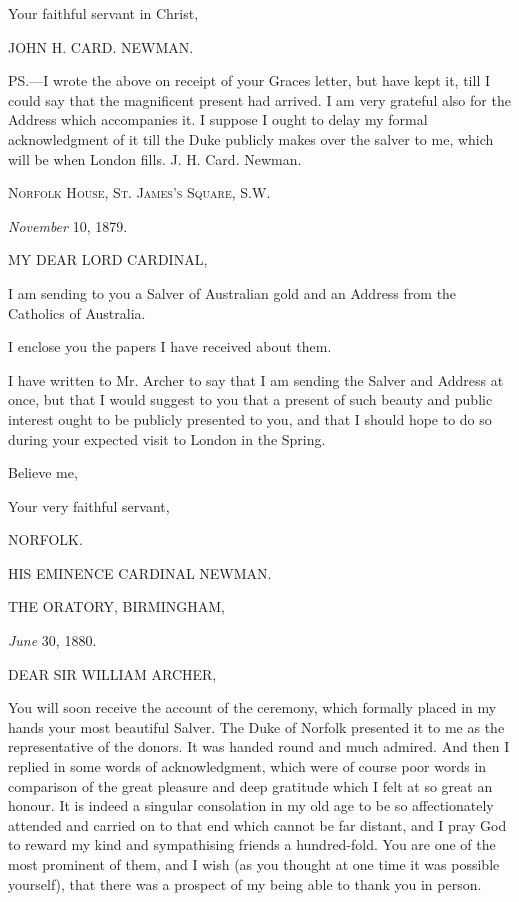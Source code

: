 Your faithful servant in Christ,

JOHN H. CARD. NEWMAN.

PS.—I wrote the above on receipt of your Graces letter, but have
kept it, till I could say that the magnificent present had arrived. I
am very grateful also for the Address which accompanies it. I suppose
I ought to delay my formal acknowledgment of it till the Duke publicly
makes over the salver to me, which will be when London fills. J. H.
Card. Newman.


N\textsc{orfolk} H\textsc{ouse}, S\textsc{t}.
J\textsc{ames's} S\textsc{quare}, S.W.

\emph{November} 10, 1879.

MY DEAR LORD
CARDINAL,

I am sending to you a Salver of Australian gold and an Address from
the Catholics of Australia.

I enclose you the papers I have received about them.

I have written to Mr. Archer to say that I am sending the Salver
and Address at once, but that I would suggest to you that a present of
such beauty and public interest ought to be publicly presented to you,
and that I should hope to do so during your expected visit to London
in the Spring.

Believe me,

Your very faithful servant,

NORFOLK.

HIS EMINENCE
CARDINAL NEWMAN.


THE ORATORY, BIRMINGHAM,

\emph{June} 30, 1880.

DEAR SIR WILLIAM
ARCHER,

You will soon receive the account of the ceremony, which formally
placed in my hands your most beautiful Salver. The Duke of Norfolk
presented it to me as the representative of the donors. It was handed
round and much admired. And then I replied in some words of
acknowledgment, which were of course poor words in comparison of the
great pleasure and deep gratitude which I felt at so great an honour.
It is indeed a singular consolation in my old age to be so
affectionately attended and carried on to that end which cannot be far
distant, and I pray God to reward my kind and sympathising friends a
hundred-fold. You are one of the most prominent of them, and I
wish (as you thought at one time it was possible yourself), that there
was a prospect of my being able to thank you in person.

